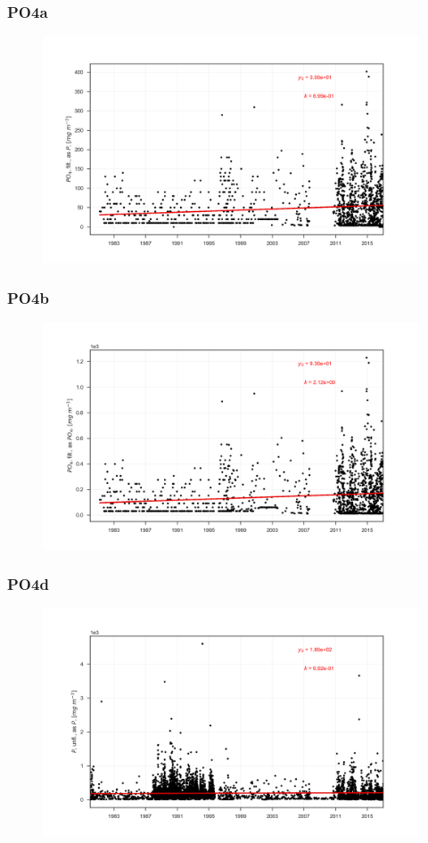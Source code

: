\documentclass{beamer}
\begin{document}
\begin{frame}
\frametitle{PO4a}
\begin{figure}
\includegraphics[width=\textwidth]{rivers/all/all_years/PO4a.png}
\end{figure}
\end{frame}

\begin{frame}
\frametitle{PO4b}
\begin{figure}
\includegraphics[width=\textwidth]{rivers/all/all_years/PO4b.png}
\end{figure}
\end{frame}

\begin{frame}
\frametitle{PO4d}
\begin{figure}
\includegraphics[width=\textwidth]{rivers/all/all_years/PO4d.png}
\end{figure}
\end{frame}
\end{document}
